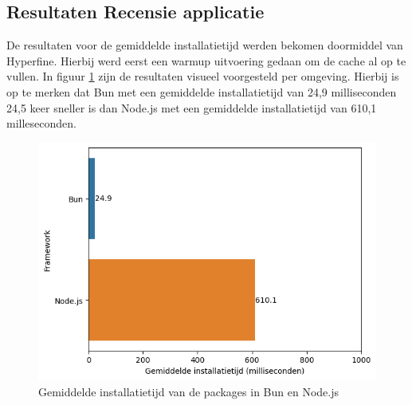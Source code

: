\subsection{Resultaten Recensie applicatie}
De resultaten voor de gemiddelde installatietijd werden bekomen doormiddel van Hyperfine.
Hierbij werd eerst een warmup uitvoering gedaan om de cache al op te vullen.
In figuur \ref{fig:installatietijdapp} zijn de resultaten visueel voorgesteld per omgeving.
Hierbij is op te merken dat Bun met een gemiddelde installatietijd van 24,9 milliseconden 24,5 keer sneller 
is dan Node.js met een gemiddelde installatietijd van 610,1 milleseconden.
\begin{figure}[H]
  \centering
  \includegraphics{graphics/install.png}
  \caption{\label{fig:installatietijdapp}Gemiddelde installatietijd van de packages in Bun en Node.js}
\end{figure}